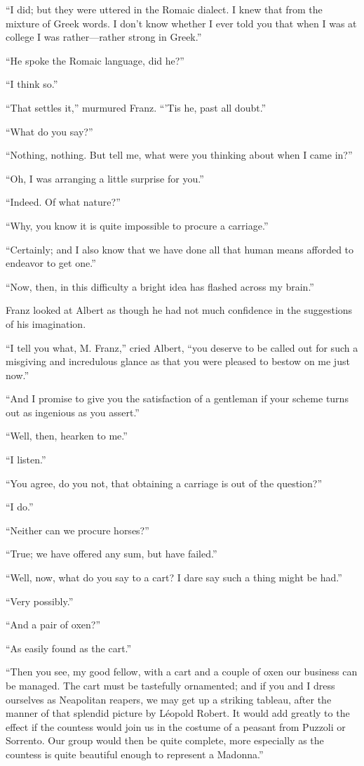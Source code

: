 “I did; but they were uttered in the Romaic dialect. I knew that from
the mixture of Greek words. I don’t know whether I ever told you that
when I was at college I was rather—rather strong in Greek.”

“He spoke the Romaic language, did he?”

“I think so.”

“That settles it,” murmured Franz. “’Tis he, past all doubt.”

“What do you say?”

“Nothing, nothing. But tell me, what were you thinking about when I
came in?”

“Oh, I was arranging a little surprise for you.”

“Indeed. Of what nature?”

“Why, you know it is quite impossible to procure a carriage.”

“Certainly; and I also know that we have done all that human means
afforded to endeavor to get one.”

“Now, then, in this difficulty a bright idea has flashed across my
brain.”

Franz looked at Albert as though he had not much confidence in the
suggestions of his imagination.

“I tell you what, M. Franz,” cried Albert, “you deserve to be called
out for such a misgiving and incredulous glance as that you were
pleased to bestow on me just now.”

“And I promise to give you the satisfaction of a gentleman if your
scheme turns out as ingenious as you assert.”

“Well, then, hearken to me.”

“I listen.”

“You agree, do you not, that obtaining a carriage is out of the
question?”

“I do.”

“Neither can we procure horses?”

“True; we have offered any sum, but have failed.”

“Well, now, what do you say to a cart? I dare say such a thing might be
had.”

“Very possibly.”

“And a pair of oxen?”

“As easily found as the cart.”

“Then you see, my good fellow, with a cart and a couple of oxen our
business can be managed. The cart must be tastefully ornamented; and if
you and I dress ourselves as Neapolitan reapers, we may get up a
striking tableau, after the manner of that splendid picture by Léopold
Robert. It would add greatly to the effect if the countess would join
us in the costume of a peasant from Puzzoli or Sorrento. Our group
would then be quite complete, more especially as the countess is quite
beautiful enough to represent a Madonna.”

